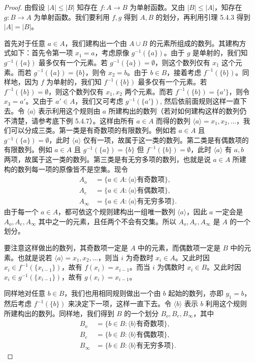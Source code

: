 \begin{proof}
由假设 $|A| \leq |B|$ 知存在 $f : A \to B$ 为单射函数。又由 $|B| \leq |A|$，知存在 $g : B \to A$ 为单射函数。我们要利用 $f, g$ 得到 $A, B$ 的划分，再利用引理 5.4.3 得到 $|A| = |B|$。

首先对于任意 $a \in A$，我们建构出一个由 $A \cup B$ 的元素所组成的数列。其建构方式如下：首先令第一项 $x_1 = a$，考虑原像 $g^{-1}(\{a\})$。由于 $g$ 是单射的，我们知 $g^{-1}(\{a\})$ 最多仅有一个元素。若 $g^{-1}(\{a\}) = \emptyset$，则这个数列仅有 $x_1$ 这个元素。而若 $g^{-1}(\{a\}) = \{b\}$，则令 $x_2 = b$。由于 $b \in B$，接着考虑 $f^{-1}(\{b\})$。同样地，因为 $f$ 为单射的，我们知 $f^{-1}(\{b\})$ 最多仅有一个元素。若 $f^{-1}(\{b\}) = \emptyset$，则这个数列仅有 $x_1, x_2$ 两个元素。而若 $f^{-1}(\{b\}) = \{a'\}$，则令 $x_3 = a'$。又由于 $a' \in A$，我们又可考虑 $g^{-1}(\{a'\})$, 然后依前面规则这样一直下去。令 $\langle a \rangle$ 表示利用这个规则由 $a$ 所建构出的数列（若对如何建构这样的数列仍不清楚，请参考底下例 5.4.7）。这样由所有 $a \in A$ 而得的数列 $\langle a \rangle = x_1, x_2, \dots$，我们可以分成三类。第一类是有奇数项的有限数列。例如若 $a \in A$ 且 $g^{-1}(\{a\}) = \emptyset$，此时 $\langle a \rangle$ 仅有一项，故属于这一类的数列。第二类是有偶数项的有限数列。例如 $a \in A$ 且 $g^{-1}(\{a\}) = \{b\}$ 但 $f^{-1}(\{b\}) = \emptyset$，此时 $\langle a \rangle$ 有 $a, b$ 两项，故属于这一类的数列。第三类是有无穷多项的数列，也就是说 $a \in A$ 所建构的数列每一项的原像皆不是空集。现令
\begin{align*}
    A_o &= \{a \in A : \langle a \rangle \text{有奇数项}\},\\
    A_e &= \{a \in A : \langle a \rangle \text{有偶数项}\}, \\
    A_\infty &= \{a \in A : \langle a \rangle \text{有无穷多项}\}.
\end{align*}
由于每一个 $a \in A$，都可依这个规则建构出一组唯一数列 $\langle a \rangle$，因此 $a$ 一定会是 $A_o, A_e, A_\infty$ 其中之一的元素，且任两个不会有交集。所以 $A_o, A_e, A_\infty$ 是 $A$ 的一个划分。

要注意这样做出的数列，其奇数项一定是 $A$ 中的元素，而偶数项一定是 $B$ 中的元素。也就是说若 $\langle a \rangle = x_1, x_2, \dots$，则当 $i$ 为奇数时 $x_i \in A$。又此时因 $x_i \in f^{-1}(\{x_{i-1}\})$，故有 $f(x_i) = x_{i-1}$。而当 $i$ 为偶数时 $x_i \in B$。又此时因 $x_i \in g^{-1}(\{x_{i-1}\})$，故有 $g(x_i) = x_{i-1}$。

同样地对任意 $b \in B$，我们也用相同规则做出一个由 $b$ 起始的数列，亦即 $y_1 = b$，然后考虑 $f^{-1}(\{b\})$ 来决定下一项，这样一直下去。令 $\langle b \rangle$ 表示 $b$ 利用这个规则所建构出的数列。同样地，我们得到 $B$ 的一个划分 $B_o, B_e, B_\infty$，其中
\begin{align*}
    B_o &= \{b \in B : \langle b \rangle \text{有奇数项}\}, \\
    B_e &= \{b \in B : \langle b \rangle \text{有偶数项}\},\\
    B_\infty &= \{b \in B : \langle b \rangle \text{有无穷多项}\}.
\end{align*}


\end{proof}
